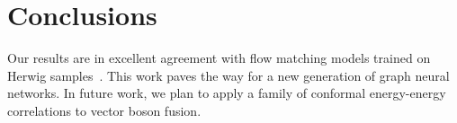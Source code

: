 \section{Conclusions}\label{sec:conclusions}

Our results are in excellent agreement with flow matching models trained
on Herwig
samples~\cite{TPC:2384-Its-Collinear-Emissions-All-the-Way-Down-October-4-2026}.
This work paves the way for a new generation of graph neural networks.
In future work, we plan to apply a family of conformal energy-energy
correlations to vector boson fusion.

